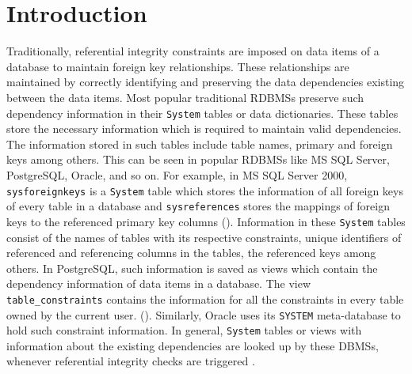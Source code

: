 \section{Introduction}\label{IntroductionSolutions}
Traditionally, referential
integrity constraints are imposed on data items of a database to maintain
foreign key relationships. These relationships are
 maintained by correctly identifying and preserving the data dependencies 
 existing between the data items.
Most popular traditional \acp{RDBMS}
preserve such dependency information in their \texttt{System} tables or data
dictionaries.  These tables store the necessary information  which is required
to maintain valid dependencies. The information stored in such tables include table
names,  primary and foreign keys among others.
This can be seen in popular \acp{RDBMS} like  MS SQL Server,  PostgreSQL,
Oracle, and so on.  For example,  in MS SQL Server 2000, \texttt{sysforeignkeys}
is a \texttt{System} table which stores the information of all 
foreign keys of every table in a database and \texttt{sysreferences}
stores the mappings of  foreign keys to the referenced primary key columns
().
Information in these \texttt{System} tables consist of  the
names of tables with its respective constraints,  unique identifiers of 
referenced and referencing columns in the tables, the  referenced keys among
others.
In PostgreSQL, such information is saved as views which contain the dependency
information of data items in a database.
The view \texttt{table\_constraints} contains the information for all the
constraints in every table owned by the current user. (\todo{\cite{}}).
Similarly, Oracle uses its \texttt{SYSTEM} meta-database to hold such constraint
information.  In general, \texttt{System} tables or views with information
about the existing dependencies  are looked up by these \acp{DBMS}, whenever referential
integrity checks are triggered \citep{sys:msdn}.

